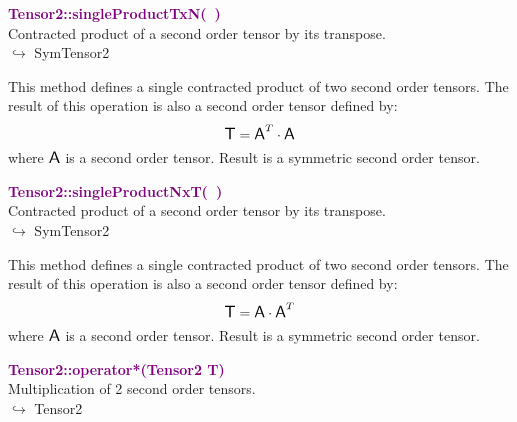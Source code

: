 \textcolor{purple}{\textbf{Tensor2::singleProductTxN(~)}}\label{Tensor2::singleProductTxN()}\\
Contracted product of a second order tensor by its transpose.\\ \hspace*{10mm}$\hookrightarrow$ SymTensor2

This method defines a single contracted product of two second order tensors.
The result of this operation is also a second order tensor defined by:
\begin{equation*}
\mbox{\large\ensuremath{\mathsf{T}}} = \mbox{\large\ensuremath{\mathsf{A}}}^T\cdot \mbox{\large\ensuremath{\mathsf{A}}}
\end{equation*}
where $\mbox{\large\ensuremath{\mathsf{A}}}$ is a second order tensor. Result is a symmetric second order tensor.

\textcolor{purple}{\textbf{Tensor2::singleProductNxT(~)}}\label{Tensor2::singleProductNxT()}\\
Contracted product of a second order tensor by its transpose.\\ \hspace*{10mm}$\hookrightarrow$ SymTensor2

This method defines a single contracted product of two second order tensors.
The result of this operation is also a second order tensor defined by:
\begin{equation*}
\mbox{\large\ensuremath{\mathsf{T}}} = \mbox{\large\ensuremath{\mathsf{A}}} \cdot \mbox{\large\ensuremath{\mathsf{A}}}^T
\end{equation*}
where $\mbox{\large\ensuremath{\mathsf{A}}}$ is a second order tensor. Result is a symmetric second order tensor.

\textcolor{purple}{\textbf{Tensor2::operator*(Tensor2 T)}}\label{Tensor2::operator*(Tensor2 T)}\\
Multiplication of 2 second order tensors.\\ \hspace*{10mm}$\hookrightarrow$ Tensor2


